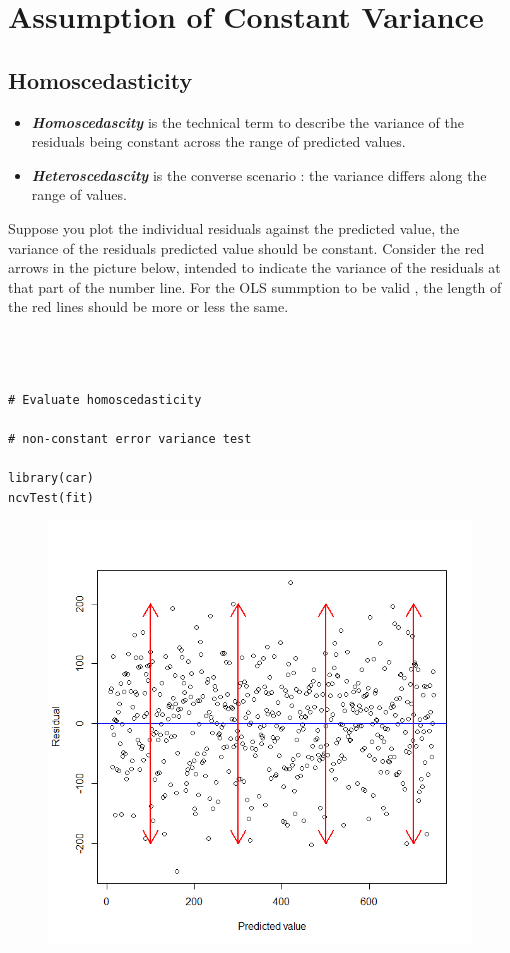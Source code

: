 \documentclass[residuals.tex]{subfiles}
\begin{document}
\Large
\section{Assumption of Constant Variance}
\subsection*{Homoscedasticity}
\begin{itemize}
\item \textbf{\textit{Homoscedascity}} is the technical term to describe the variance of the residuals being constant across the range of predicted values. 

\item \textbf{\textit{Heteroscedascity}} is the converse scenario : the variance differs along the range of values.
\end{itemize}


\noindent Suppose you plot the individual residuals against the predicted value, the variance of the residuals predicted value should be constant. 
\bigskip
\noindent Consider the red arrows in the picture below, intended to indicate the variance of the residuals at that part of the number line. For the OLS summption to be valid , the length of the red lines should be more or less the same.
\newpage

\begin{framed}

\begin{verbatim}	



# Evaluate homoscedasticity

# non-constant error variance test

library(car)
ncvTest(fit)
\end{verbatim}
\end{framed}


\begin{figure}[h!]
\centering
\includegraphics[width=0.6\linewidth]{homosked}
\caption{}
\label{fig:homosked}
\end{figure}
\end{document}

